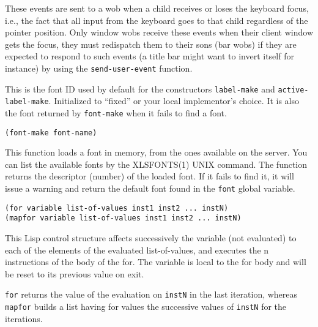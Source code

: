         

These events are sent to a wob when a child receives or loses the keyboard
focus, i.e., the fact that all input from the keyboard goes to that child
regardless of the pointer position. Only window wobs receive these events
when their client window gets the focus,
they must redispatch them to their sons (bar wobs) if they are expected to
respond to such events (a title bar might want to invert itself for instance)
by using the \verb"send-user-event" function.

        

This is the font ID used by default for the
constructors \verb"label-make" and \verb"active-label-make". Initialized to
``fixed'' or your local implementor's choice.
It is also the font returned by \verb"font-make" when it fails to find a font.

        
{\usagefont\begin{verbatim}
(font-make font-name)
\end{verbatim}}\usageupspace

This function loads a font in memory, from the ones available on the server.
You can list the available fonts by the XLSFONTS(1) UNIX command. The function
returns the descriptor (number) of the loaded font. If it fails to find it,
it will issue a warning and return the default font found in the \verb"font"
global variable.

        
{\usagefont\begin{verbatim}
(for variable list-of-values inst1 inst2 ... instN)
(mapfor variable list-of-values inst1 inst2 ... instN)
\end{verbatim}}\usageupspace

This Lisp control structure affects successively the variable (not
evaluated) to each of the elements  of the evaluated list-of-values, and
executes the n instructions of the body of the for.  The variable is local
to the for body and will be reset to its previous value on exit.

\verb"for"  returns the value of the evaluation on \verb"instN" in
the last iteration, whereas \verb"mapfor" builds a list having for
values the successive values of \verb"instN" for the iterations.

